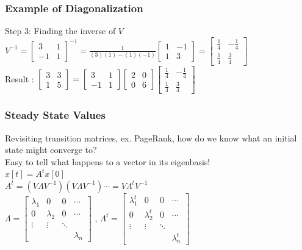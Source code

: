 \documentclass{beamer}
\begin{document}
\begin{frame}
\frametitle{Example of Diagonalization}

Step 3: Finding the inverse of $V$ \\
\large
$V^{-1} = \begin{bmatrix} 3 & 1 \\ -1 & 1\end{bmatrix} ^{-1} = \frac{1}{(3)(1)-(1)(-1)} \begin{bmatrix}1&-1\\1&3\end{bmatrix} = \begin{bmatrix}\frac{1}{4} & -\frac{1}{4} \\ \frac{1}{4} & \frac{3}{4} \end{bmatrix}$ \\
Result : 
$\begin{bmatrix} 3&3\\1&5\end{bmatrix} = \begin{bmatrix}3&1\\-1&1\end{bmatrix} \begin{bmatrix}2&0\\0&6\end{bmatrix} \begin{bmatrix}\frac{1}{4} & -\frac{1}{4} \\ \frac{1}{4} & \frac{3}{4} \end{bmatrix}$





\end{frame}

\begin{frame}
\frametitle{Steady State Values}
Revisiting transition matrices, ex. PageRank, how do we know what an initial state might converge to? \\
Easy to tell what happens to a vector in its eigenbasis! \\
$x[t] = A^t x[0]$ \\
$A^t = (V\Lambda V^{-1})(V\Lambda V^{-1}) \cdots = V\Lambda^t V^{-1}$ \\
$\Lambda = 
\begin{bmatrix} 
\lambda_1 & 0 & 0 & \cdots \\
0 & \lambda_2 & 0 & \cdots \\
\vdots & \vdots & \ddots & \\
 & & & \lambda_n\end{bmatrix}$
, 
$\Lambda^t = 
\begin{bmatrix} 
\lambda_1^t & 0 & 0 & \cdots \\
0 & \lambda_2^t & 0 & \cdots \\
\vdots & \vdots & \ddots & \\
 & & & \lambda_n^t\end{bmatrix}$

\end{frame}
\end{document}
